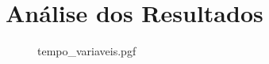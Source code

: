 \section{Análise dos Resultados}

    \begin{figure}[H]
        \centering
        {tempo_variaveis.pgf}
    \end{figure}
